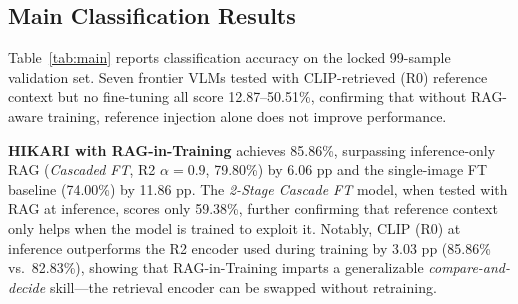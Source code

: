 \documentclass[conference,a4paper]{IEEEtran}
\begin{document}
\subsection{Main Classification Results}

Table~\ref{tab:main} reports classification accuracy on the locked
99-sample validation set.  Seven frontier VLMs tested with CLIP-retrieved
(R0) reference context but no fine-tuning all score 12.87--50.51\%,
confirming that without RAG-aware training, reference injection alone
does not improve performance.

\textbf{HIKARI with RAG-in-Training} achieves 85.86\%, surpassing
inference-only RAG (\textit{Cascaded FT}, R2 $\alpha{=}0.9$, 79.80\%)
by 6.06 pp and the single-image FT baseline (74.00\%) by 11.86 pp.
The \textit{2-Stage Cascade FT} model, when tested with RAG at inference,
scores only 59.38\%, further confirming that reference context only
helps when the model is trained to exploit it.  Notably, CLIP (R0) at
inference outperforms the R2 encoder used during training by 3.03 pp
(85.86\% vs.\ 82.83\%), showing that RAG-in-Training imparts a
generalizable \textit{compare-and-decide} skill---the retrieval encoder
can be swapped without retraining.
\end{document}
